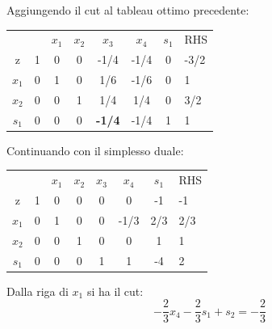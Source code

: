 Aggiungendo il cut al tableau ottimo precedente:
\begin{table}[!h]
	\centering
	\begin{tabular}{cccccccc}
				&                         & $x_{1}$ & $x_{2}$  & $x_{3}$ & $x_{4}$ & $s_{1}$ &  RHS  \\ \cline{2-8}
		z		& \multicolumn{1}{|l|}{1} & 0       & 0        & -1/4    & -1/4    & 0 & \multicolumn{1}{|l|}{-3/2} \\ \cline{2-8}
		$x_{1}$ & \multicolumn{1}{|l|}{0} & 1       & 0        & 1/6     & -1/6    & 0 & \multicolumn{1}{|l|}{1} \\
		$x_{2}$ & \multicolumn{1}{|l|}{0} & 0       & 1        & 1/4     & 1/4     & 0 & \multicolumn{1}{|l|}{3/2} \\
		$s_{1}$ & \multicolumn{1}{|l|}{0} & 0       & 0        & \textbf{-1/4}     & -1/4   & 1  & \multicolumn{1}{|l|}{1} \\ \cline{2-8}
	\end{tabular}
\end{table}

Continuando con il simplesso duale:
\begin{table}[!h]
	\centering
	\begin{tabular}{cccccccc}
				&       				  & $x_{1}$ & $x_{2}$  & $x_{3}$ & $x_{4}$ & $s_{1}$ &  RHS  \\ \cline{2-8}
		z		& \multicolumn{1}{|l|}{1} & 0       & 0        & 0       & 0       & -1      & \multicolumn{1}{|l|}{-1} \\ \cline{2-8}
		$x_{1}$ & \multicolumn{1}{|l|}{0} & 1       & 0        & 0       & -1/3    & 2/3     & \multicolumn{1}{|l|}{2/3} \\
		$x_{2}$ & \multicolumn{1}{|l|}{0} & 0       & 1        & 0       & 0       & 1       & \multicolumn{1}{|l|}{1} \\
		$s_{1}$ & \multicolumn{1}{|l|}{0} & 0       & 0        & 1       & 1       & -4      & \multicolumn{1}{|l|}{2} \\ \cline{2-8}
	\end{tabular}
\end{table}

Dalla riga di $x_{1}$ si ha il cut:
\begin{equation*}
-\frac{2}{3}x_{4} - \frac{2}{3}s_{1} + s_{2} = - \frac{2}{3}
\end{equation*}

